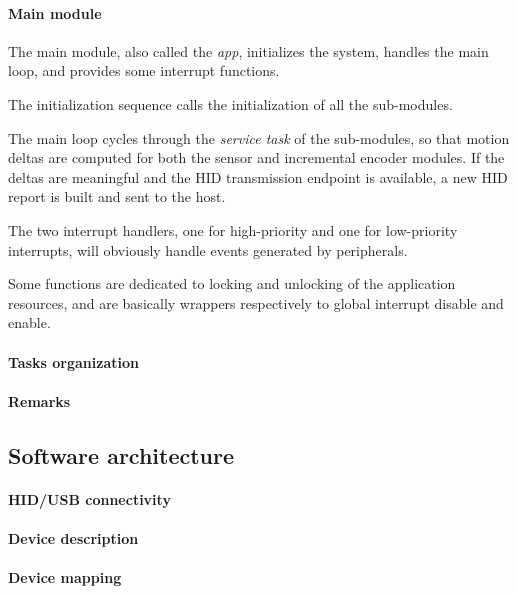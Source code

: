 \documentclass[a4paper,10pt]{article}
\begin{document}
\begin{multicols}{2}
\paragraph{Main module}
The main module, also called the \emph{app}, initializes the system, handles
the main loop, and provides some interrupt functions.

The initialization sequence calls the initialization of all the sub-modules.

The main loop cycles through the \emph{service task} of the sub-modules, so
that motion deltas are computed for both the sensor and incremental encoder
modules. If the deltas are meaningful and the HID transmission endpoint is
available, a new HID report is built and sent to the host.

The two interrupt handlers, one for high-priority and one for low-priority
interrupts, will obviously handle events generated by peripherals.

Some functions are dedicated to locking and unlocking of the application
resources, and are basically wrappers respectively to global interrupt disable
and enable.


\paragraph{Tasks organization}
\TODO


\paragraph{Remarks}
\TODO


\subsection{Software architecture}

\TODO


\paragraph{HID/USB connectivity}
\TODO


\paragraph{Device description}
\TODO


\paragraph{Device mapping}
\TODO



\end{multicols}
\end{document}
